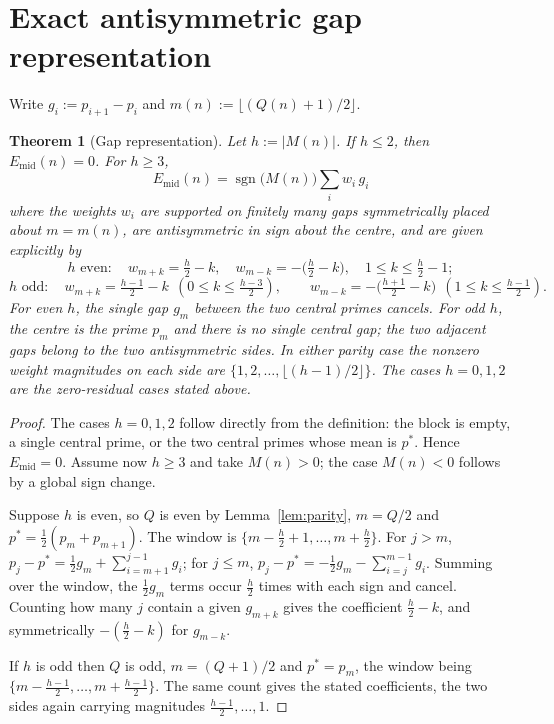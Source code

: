 \documentclass[11pt]{amsart}
\numberwithin{equation}{section}
\theoremstyle{plain}
\newtheorem{theorem}{Theorem}[section]
\theoremstyle{definition}
\theoremstyle{remark}
\newcommand{\Mert}{M}
\newcommand{\Sq}{Q}
\begin{document}
\section{Exact antisymmetric gap representation}
\label{sec:gap-representation}

Write $g_i:=p_{i+1}-p_i$ and $m(n):=\lfloor(\Sq(n)+1)/2\rfloor$.

\begin{theorem}[Gap representation]\label{thm:gaps}
Let $h:=|\Mert(n)|$. If $h\le2$, then $E_{\mathrm{mid}}(n)=0$. For $h\ge3$,
\begin{equation}
\label{eq:gap-representation}
\boxed{\;
E_{\mathrm{mid}}(n)=\operatorname{sgn}\bigl(\Mert(n)\bigr)\sum_{i}w_i\,g_i \;}
\end{equation}
where the weights $w_i$ are supported on finitely many gaps symmetrically
placed about $m=m(n)$, are antisymmetric in sign about the centre, and are given
explicitly by
\begin{equation}
\label{eq:even-weights}
h \text{ even}:\quad
w_{m+k}=\tfrac h2-k,\quad w_{m-k}=-\bigl(\tfrac h2-k\bigr),\quad 1\le k\le \tfrac h2-1;
\end{equation}
\begin{equation}
\label{eq:odd-weights}
h \text{ odd}:\quad
w_{m+k}=\tfrac{h-1}2-k \ \ (0\le k\le \tfrac{h-3}2),
\qquad
w_{m-k}=-\bigl(\tfrac{h+1}2-k\bigr)\ \ (1\le k\le \tfrac{h-1}2).
\end{equation}
For even $h$, the single gap $g_m$ between the two central primes cancels. For odd
$h$, the centre is the prime $p_m$ and there is no single central gap; the two adjacent
gaps belong to the two antisymmetric sides. In either parity case the nonzero weight
magnitudes on each side are $\{1,2,\dots,\lfloor (h-1)/2\rfloor\}$. The cases
$h=0,1,2$ are the zero-residual cases stated above.
\end{theorem}

\begin{proof}
The cases $h=0,1,2$ follow directly from the definition: the block is empty, a
single central prime, or the two central primes whose mean is $p^*$. Hence
$E_{\mathrm{mid}}=0$. Assume now $h\ge3$ and take $\Mert(n)>0$; the case
$\Mert(n)<0$ follows by a global sign change.

Suppose $h$ is even, so $\Sq$ is even by Lemma~\ref{lem:parity}, $m=\Sq/2$ and
$p^{*}=\tfrac12(p_m+p_{m+1})$. The window is $\{m-\tfrac h2+1,\dots,m+\tfrac h2\}$.
For $j>m$, $p_j-p^{*}=\tfrac12 g_m+\sum_{i=m+1}^{j-1}g_i$; for $j\le m$,
$p_j-p^{*}=-\tfrac12 g_m-\sum_{i=j}^{m-1}g_i$. Summing over the window, the
$\tfrac12 g_m$ terms occur $\tfrac h2$ times with each sign and cancel. Counting
how many $j$ contain a given $g_{m+k}$ gives the coefficient $\tfrac h2-k$, and
symmetrically $-(\tfrac h2-k)$ for $g_{m-k}$.

If $h$ is odd then $\Sq$ is odd, $m=(\Sq+1)/2$ and $p^{*}=p_m$, the window being
$\{m-\tfrac{h-1}2,\dots,m+\tfrac{h-1}2\}$. The same count gives the stated
coefficients, the two sides again carrying magnitudes
$\tfrac{h-1}2,\dots,1$.
\end{proof}
\end{document}
